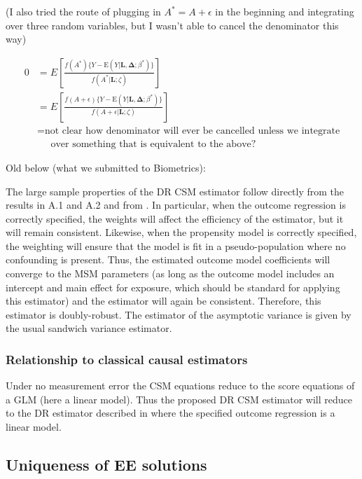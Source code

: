 \documentclass[12pt]{article}
\begin{document}
\vspace{3cm}

(I also tried the route of plugging in $A^{*} = A + \epsilon$ in the beginning and integrating over three random variables, but I wasn't able to cancel the denominator this way)

\begin{align*}
0 &= E \left [ \frac{f(A^{*}) \{ Y - \text{E}(Y | \bm{L}, \bm{\Delta}; \beta^{*}) \}}{f(A^{*} | \bm{L}; \zeta)} \right ] \\
&= E \left [ \frac{f(A + \epsilon) \{ Y - \text{E}(Y | \bm{L}, \bm{\Delta}; \beta^{*}) \}}{f(A + \epsilon | \bm{L}; \zeta)} \right ] \\
&= \text{not clear how denominator will ever be cancelled unless we integrate} \\
& \;\;\;\;\; \text{over something that is equivalent to the above?}
\end{align*}




Old below (what we submitted to Biometrics):

The large sample properties of the DR CSM estimator follow directly from the results in A.1 and A.2 and from \citet{kang2007}. In particular, when the outcome regression is correctly specified, the weights will affect the efficiency of the estimator, but it will remain consistent. Likewise, when the propensity model is correctly specified, the weighting will ensure that the model is fit in a pseudo-population where no confounding is present. Thus, the estimated outcome model coefficients will converge to the MSM parameters (as long as the outcome model includes an intercept and main effect for exposure, which should be standard for applying this estimator) and the estimator will again be consistent. Therefore, this estimator is doubly-robust. The estimator of the asymptotic variance is given by the usual sandwich variance estimator.

\subsubsection{Relationship to classical causal estimators}

Under no measurement error the CSM equations reduce to the score equations of a GLM (here a linear model). Thus the proposed DR CSM estimator will reduce to the DR estimator described in \citet{kang2007} where the specified outcome regression is a linear model.

\subsection{Uniqueness of EE solutions}
\end{document}
